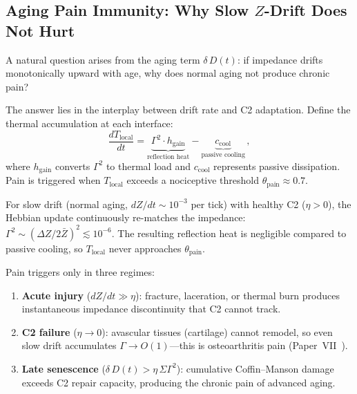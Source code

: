 ﻿\documentclass[aps,pre,twocolumn,superscriptaddress,floatfix]{revtex4-2}
\begin{document}
\subsection{Aging Pain Immunity: Why Slow $Z$-Drift Does Not Hurt}
\label{sec:aging-pain}

A natural question arises from the aging term
$\delta\,D(t)$: if impedance drifts monotonically
upward with age, why does normal aging not produce
chronic pain?

The answer lies in the interplay between drift rate
and C2 adaptation.
Define the thermal accumulation at each interface:
\begin{equation}
  \frac{dT_{\text{local}}}{dt}
    = \underbrace{\Gamma^2 \cdot h_{\text{gain}}}_{\text{reflection heat}}
    - \underbrace{c_{\text{cool}}}_{\text{passive cooling}}\,,
  \label{eq:pain-model}
\end{equation}
where $h_{\text{gain}}$ converts $\Gamma^2$ to thermal load
and $c_{\text{cool}}$ represents passive dissipation.
Pain is triggered when $T_{\text{local}}$ exceeds a
nociceptive threshold $\theta_{\text{pain}} \approx 0.7$.

For slow drift (normal aging, $dZ/dt \sim 10^{-3}$
per tick) with healthy C2 ($\eta > 0$), the Hebbian
update continuously re-matches the impedance:
$\Gamma^2 \sim (\Delta Z / 2\bar{Z})^2 \lesssim 10^{-6}$.
The resulting reflection heat is negligible compared
to passive cooling, so $T_{\text{local}}$ never
approaches $\theta_{\text{pain}}$.

Pain triggers only in three regimes:
\begin{enumerate}
  \item \textbf{Acute injury} ($dZ/dt \gg \eta$):
    fracture, laceration, or thermal burn produces
    instantaneous impedance discontinuity that
    C2 cannot track.
  \item \textbf{C2 failure} ($\eta \to 0$):
    avascular tissues (cartilage) cannot remodel,
    so even slow drift accumulates
    $\Gamma \to O(1)$---this is osteoarthritis
    pain (Paper~VII~\cite{PaperVII}).
  \item \textbf{Late senescence}
    ($\delta\,D(t) > \eta\,\Sigma\Gamma^2$):
    cumulative Coffin--Manson damage exceeds
    C2 repair capacity, producing the chronic pain
    of advanced aging.
\end{enumerate}
\end{document}

